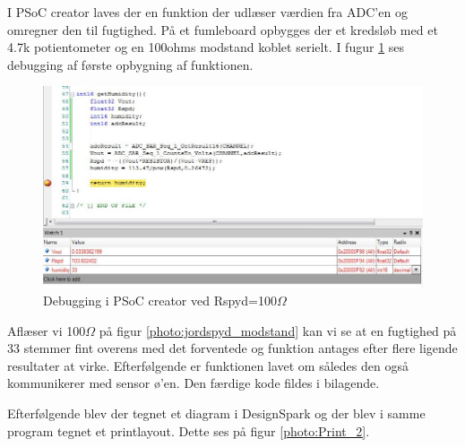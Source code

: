 I PSoC creator laves der en funktion der udlæser værdien fra ADC'en og omregner den til fugtighed. På et fumleboard opbygges der et kredsløb med et 4.7k potientometer og en 100ohms modstand koblet serielt. I fugur \ref{photo:debug100} ses debugging af første opbygning af funktionen.

\begin{figure}[H]
	\centering 
	\includegraphics[scale=0.8]{HardwareArkitektur/Sensore/Jordfugt_billeder/debug100ohm.jpg}
	\caption{Debugging i PSoC creator ved Rspyd=100$\Omega$}
	\label{photo:debug100}
\end{figure} 

Aflæser vi 100$\Omega$ på figur \ref{photo:jordspyd_modstand} kan vi se at en fugtighed på 33 stemmer fint overens med det forventede og funktion antages efter flere ligende resultater at virke. Efterfølgende er funktionen lavet om således den også kommunikerer med sensor ø'en. Den færdige kode fildes i bilagende. 

Efterfølgende blev der tegnet et diagram i DesignSpark og der blev i samme program tegnet et printlayout. Dette ses på figur \ref{photo:Print_2}.

